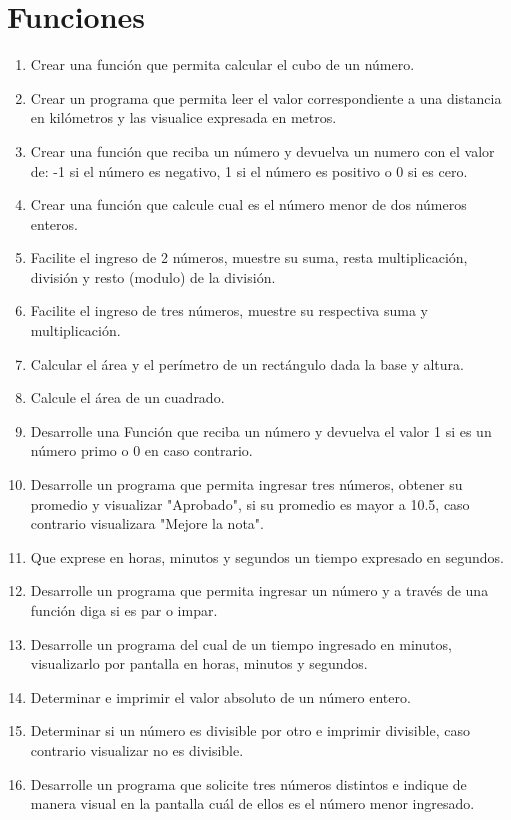 \documentclass{scrartcl}
\begin{document}
	\section{Funciones}
	
	\begin{enumerate}
		\item Crear una función que permita calcular el cubo de un número.
		\item Crear un programa que permita leer el valor correspondiente a una distancia en kilómetros y las visualice expresada en metros.
		\item Crear una función que reciba un número y devuelva un numero con el valor de: -1 si el número es negativo, 1 si el número es positivo o 0 si es cero.
		\item Crear una función que calcule cual es el número menor de dos números enteros.
		\item Facilite el ingreso de 2 números, muestre su suma, resta multiplicación, división y resto (modulo) de la división.
		\item Facilite el ingreso de tres números, muestre su respectiva suma y		multiplicación.
		\item Calcular el área y el perímetro de un rectángulo dada la base y altura.
		
		\item Calcule el área de un cuadrado.
		\item Desarrolle una Función que reciba un número y devuelva el valor 1 si		es un número primo o 0 en caso contrario.
		
		\item Desarrolle un programa que permita ingresar tres números, obtener su promedio y visualizar "Aprobado", si su promedio es mayor a 10.5, caso contrario visualizara "Mejore la nota".
		\item Que exprese en horas, minutos y segundos un tiempo expresado en segundos.
		\item Desarrolle un programa que permita ingresar un número y a través de una función diga si es par o impar.
		\item Desarrolle un programa del cual de un tiempo ingresado en minutos, visualizarlo por pantalla en horas, minutos y segundos.
		\item Determinar e imprimir el valor absoluto de un número entero.
		\item Determinar si un número es divisible por otro e imprimir divisible, caso contrario visualizar no es divisible.
		\item Desarrolle un programa que solicite tres números distintos e indique		de manera visual en la pantalla cuál de ellos es el número menor ingresado.
	\end{enumerate}
\end{document}
